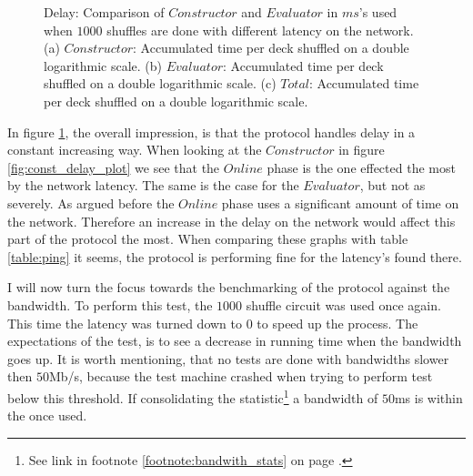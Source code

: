 \documentclass[twoside,11pt,openright]{report}
\begin{document}
\begin{figure}
    \vspace*{0cm}

    \begin{subfigure}{\textwidth}
        \centering
        \caption{}
        \label{fig:total_delay_plot}
    \end{subfigure}
    \caption{Delay: Comparison of $Constructor$ and $Evaluator$ in $ms$'s used when $1000$ shuffles are done with different latency on the network. (a) $Constructor$: Accumulated time per deck shuffled on a double logarithmic scale. (b) $Evaluator$: Accumulated time per deck shuffled on a double logarithmic scale. (c) $Total$: Accumulated time per deck shuffled on a double logarithmic scale.}
    \label{fig:mesurement_delay}
\end{figure}

In figure \ref{fig:total_delay_plot}, the overall impression, is that the protocol handles delay in a constant increasing way. When looking at the $Constructor$ in figure \ref{fig:const_delay_plot} we see that the $Online$ phase is the one effected the most by the network latency. The same is the case for the $Evaluator$, but not as severely. As argued before the $Online$ phase uses a significant amount of time on the network. Therefore an increase in the delay on the network would affect this part of the protocol the most. When comparing these graphs with table \ref{table:ping} it seems, the protocol is performing fine for the latency's found there.

\bigskip

I will now turn the focus towards the benchmarking of the protocol against the bandwidth. To perform this test, the $1000$ shuffle circuit was used once again. This time the latency was turned down to $0$ to speed up the process. The expectations of the test, is to see a decrease in running time when the bandwidth goes up. It is worth mentioning, that no tests are done with bandwidths slower then $50$Mb/s, because the test machine crashed when trying to perform test below this threshold. If consolidating the statistic\footnote{See link in footnote \ref{footnote:bandwith_stats} on page \pageref{footnote:bandwith_stats}.} a bandwidth of $50$ms is within the once used. 
\end{document}
